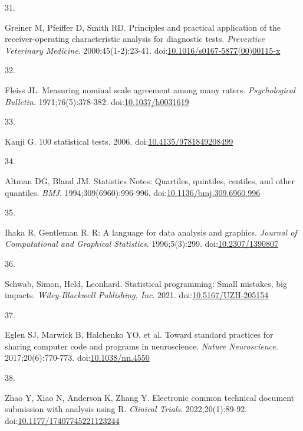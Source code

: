\documentclass[
]{book}
\newlength{\cslhangindent}
\newlength{\csllabelwidth}
\newlength{\cslentryspacingunit} %
\newenvironment{CSLReferences}[2] %
 {%
  \setlength{\parindent}{0pt}
  \ifodd #1
  \let\oldpar\par
  \def\par{\hangindent=\cslhangindent\oldpar}
  \fi
  \setlength{\parskip}{#2\cslentryspacingunit}
 }%
 {}
\newcommand{\CSLLeftMargin}[1]{\parbox[t]{\csllabelwidth}{#1}}
\newcommand{\CSLRightInline}[1]{\parbox[t]{\linewidth - \csllabelwidth}{#1}\break}
\begin{document}
\begin{CSLReferences}{0}{0}
\leavevmode{}%
\CSLLeftMargin{31. }%
\CSLRightInline{Greiner M, Pfeiffer D, Smith RD. Principles and practical application of the receiver-operating characteristic analysis for diagnostic tests. \emph{Preventive Veterinary Medicine}. 2000;45(1-2):23-41. doi:\href{https://doi.org/10.1016/s0167-5877(00)00115-x}{10.1016/s0167-5877(00)00115-x}}

\leavevmode{}%
\CSLLeftMargin{32. }%
\CSLRightInline{Fleiss JL. Measuring nominal scale agreement among many raters. \emph{Psychological Bulletin}. 1971;76(5):378-382. doi:\href{https://doi.org/10.1037/h0031619}{10.1037/h0031619}}

\leavevmode{}%
\CSLLeftMargin{33. }%
\CSLRightInline{Kanji G. 100 statistical tests. 2006. doi:\href{https://doi.org/10.4135/9781849208499}{10.4135/9781849208499}}

\leavevmode{}%
\CSLLeftMargin{34. }%
\CSLRightInline{Altman DG, Bland JM. Statistics Notes: Quartiles, quintiles, centiles, and other quantiles. \emph{BMJ}. 1994;309(6960):996-996. doi:\href{https://doi.org/10.1136/bmj.309.6960.996}{10.1136/bmj.309.6960.996}}

\leavevmode{}%
\CSLLeftMargin{35. }%
\CSLRightInline{Ihaka R, Gentleman R. R: A language for data analysis and graphics. \emph{Journal of Computational and Graphical Statistics}. 1996;5(3):299. doi:\href{https://doi.org/10.2307/1390807}{10.2307/1390807}}

\leavevmode{}%
\CSLLeftMargin{36. }%
\CSLRightInline{Schwab, Simon, Held, Leonhard. Statistical programming: Small mistakes, big impacts. \emph{Wiley-Blackwell Publishing, Inc}. 2021. doi:\href{https://doi.org/10.5167/UZH-205154}{10.5167/UZH-205154}}

\leavevmode{}%
\CSLLeftMargin{37. }%
\CSLRightInline{Eglen SJ, Marwick B, Halchenko YO, et al. Toward standard practices for sharing computer code and programs in neuroscience. \emph{Nature Neuroscience}. 2017;20(6):770-773. doi:\href{https://doi.org/10.1038/nn.4550}{10.1038/nn.4550}}

\leavevmode{}%
\CSLLeftMargin{38. }%
\CSLRightInline{Zhao Y, Xiao N, Anderson K, Zhang Y. Electronic common technical document submission with analysis using R. \emph{Clinical Trials}. 2022;20(1):89-92. doi:\href{https://doi.org/10.1177/17407745221123244}{10.1177/17407745221123244}}


\end{CSLReferences}
\end{document}
